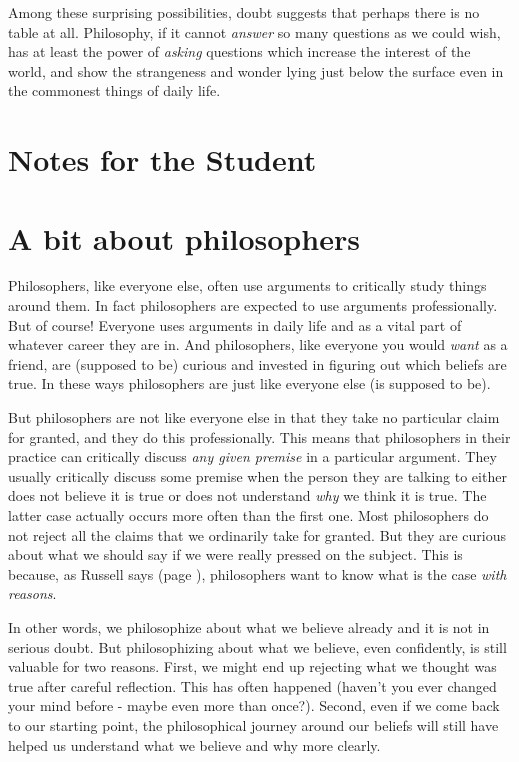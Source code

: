 \documentclass[oneside,letterpaper,12pt]{book}
\begin{document}
Among these surprising possibilities, doubt suggests that perhaps there
is no table at all. Philosophy, if it cannot \emph{answer} so many
questions as we could wish, has at least the power of \emph{asking}
questions which increase the interest of the world, and show the
strangeness and wonder lying just below the surface even in the
commonest things of daily life.

\protect\hypertarget{link2HCH0002}{}{}

\pagebreak
\section{Notes for the Student}
\section*{A bit about philosophers}
Philosophers, like everyone else, often use arguments to critically study things around them. In fact philosophers are expected to use arguments professionally. But of course! Everyone uses arguments in daily life and as a vital part of whatever career they are in. And philosophers, like everyone you would \emph{want} as a friend, are (supposed to be) curious and invested in figuring out which beliefs are true. In these ways philosophers are just like everyone else (is supposed to be).

But philosophers are not like everyone else in that they take no particular claim for granted, and they do this professionally. This means that philosophers in their practice can critically discuss \emph{any given premise} in a particular argument. They usually critically discuss some premise when the person they are talking to either does not believe it is true or does not understand \emph{why} we think it is true. The latter case actually occurs more often than the first one. Most philosophers do not reject all the claims that we ordinarily take for granted. But they are curious about what we should say if we were really pressed on the subject. This is because, as Russell says (page \pageref{reasons}), philosophers want to know what is the case \textit{with reasons}. 

In other words, we philosophize about what we believe already and it is not in serious doubt. But philosophizing about what we believe, even confidently, is still valuable for two reasons. First, we might end up rejecting what we thought was true after careful reflection. This has often happened (haven't you ever changed your mind before - maybe even more than once?). Second, even if we come back to our starting point, the philosophical journey around our beliefs will still have helped us understand what we believe and why more clearly. 
\end{document}
